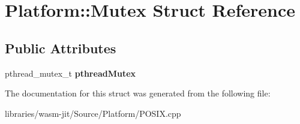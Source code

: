 \hypertarget{struct_platform_1_1_mutex}{}\section{Platform\+:\+:Mutex Struct Reference}
\label{struct_platform_1_1_mutex}
\subsection*{Public Attributes}
\begin{DoxyCompactItemize}
\item 
\mbox{\label{struct_platform_1_1_mutex_a2cfe9f699b2df5539e5e353892fc813a}} 
pthread\+\_\+mutex\+\_\+t {\bfseries pthread\+Mutex}
\end{DoxyCompactItemize}


The documentation for this struct was generated from the following file\+:\begin{DoxyCompactItemize}
\item 
libraries/wasm-\/jit/\+Source/\+Platform/P\+O\+S\+I\+X.\+cpp\end{DoxyCompactItemize}
